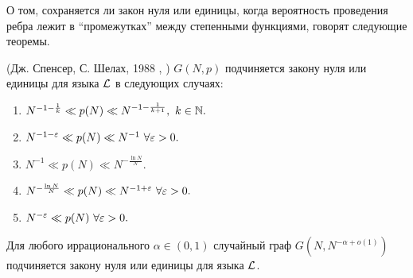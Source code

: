 О том, сохраняется ли закон нуля или единицы, когда вероятность проведения ребра лежит в ``промежутках'' между степенными функциями, говорят следующие теоремы.

\begin{theorem} (Дж. Спенсер, С. Шелах, 1988 \cite{shelah1988zero}, \cite{compton1989laws})
\label{th:spencer intermediate}
$G(N, p)$ подчиняется закону нуля или единицы для языка $\mathcal{L}$ в следующих случаях:
\begin{enumerate}
    \item $N^{-1 - \frac{1}{k}} \ll p(N) \ll N^{-1-\frac{1}{k+1}},~ k \in \mathbb {N}. $
    \item $N^{-1 -\varepsilon} \ll p(N) \ll N^{-1}~ \forall \varepsilon > 0.$
    \item $N^{-1} \ll p(N) \ll N^{-\frac{\ln{N}}{N}}.$
    \item $N^{-\frac{\ln{N}}{N}} \ll p(N) \ll N^{-1 + \varepsilon}~ \forall \varepsilon > 0.$
    \item $N^{-\varepsilon} \ll p(N)~ \forall \varepsilon > 0.$
\end{enumerate}
\end{theorem}


\begin{theorem} \cite{spencer2013strange}
Для любого иррационального $\alpha \in (0,1)$ случайный граф $G(N,N^{-\alpha +o(1)})$ подчиняется закону нуля или единицы для языка $\mathcal{L}$.
\end{theorem}

